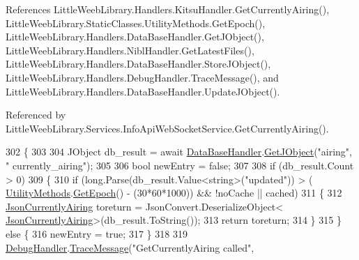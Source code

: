 References Little\+Weeb\+Library.\+Handlers.\+Kitsu\+Handler.\+Get\+Currently\+Airing(), Little\+Weeb\+Library.\+Static\+Classes.\+Utility\+Methods.\+Get\+Epoch(), Little\+Weeb\+Library.\+Handlers.\+Data\+Base\+Handler.\+Get\+J\+Object(), Little\+Weeb\+Library.\+Handlers.\+Nibl\+Handler.\+Get\+Latest\+Files(), Little\+Weeb\+Library.\+Handlers.\+Data\+Base\+Handler.\+Store\+J\+Object(), Little\+Weeb\+Library.\+Handlers.\+Debug\+Handler.\+Trace\+Message(), and Little\+Weeb\+Library.\+Handlers.\+Data\+Base\+Handler.\+Update\+J\+Object().



Referenced by Little\+Weeb\+Library.\+Services.\+Info\+Api\+Web\+Socket\+Service.\+Get\+Currently\+Airing().


\begin{DoxyCode}
302         \{
303 
304             JObject db\_result = await \mbox{\hyperlink{class_little_weeb_library_1_1_handlers_1_1_anime_profile_handler_a4764b15d1f2aaf7d21aa461508a08a62}{DataBaseHandler}}.\mbox{\hyperlink{interface_little_weeb_library_1_1_handlers_1_1_i_data_base_handler_a6586c4d1cfebdb8d5d40bc544d51914c}{GetJObject}}(\textcolor{stringliteral}{"airing"}, \textcolor{stringliteral}{"
      currently\_airing"});
305 
306             \textcolor{keywordtype}{bool} newEntry = \textcolor{keyword}{false};
307 
308             \textcolor{keywordflow}{if} (db\_result.Count > 0)
309             \{
310                 \textcolor{keywordflow}{if} (\textcolor{keywordtype}{long}.Parse(db\_result.Value<\textcolor{keywordtype}{string}>(\textcolor{stringliteral}{"updated"})) > (
      \mbox{\hyperlink{class_little_weeb_library_1_1_static_classes_1_1_utility_methods}{UtilityMethods}}.\mbox{\hyperlink{class_little_weeb_library_1_1_static_classes_1_1_utility_methods_a12336d9e64983ddabaad8950486fafb2}{GetEpoch}}() - (30*60*1000)) && !noCache || cached)
311                 \{
312                     \mbox{\hyperlink{class_little_weeb_library_1_1_models_1_1_json_currently_airing}{JsonCurrentlyAiring}} toreturn = JsonConvert.DeserializeObject<
      \mbox{\hyperlink{class_little_weeb_library_1_1_models_1_1_json_currently_airing}{JsonCurrentlyAiring}}>(db\_result.ToString());
313                     \textcolor{keywordflow}{return} toreturn;
314                 \}
315             \} \textcolor{keywordflow}{else} \{
316                 newEntry = \textcolor{keyword}{true};
317             \}
318 
319             \mbox{\hyperlink{class_little_weeb_library_1_1_handlers_1_1_anime_profile_handler_a0b0ae3c3838d26351485e6dfc566a632}{DebugHandler}}.\mbox{\hyperlink{interface_little_weeb_library_1_1_handlers_1_1_i_debug_handler_a2e405bc3492e683cd3702fae125221bc}{TraceMessage}}(\textcolor{stringliteral}{"GetCurrentlyAiring called"}, 

\end{DoxyCode}
